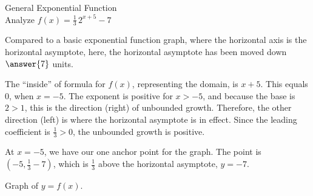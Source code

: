 \documentclass{ximera}
\begin{document}
\begin{example}  General Exponential Function \\



Analyze   $f(x) = \frac{1}{3} \, 2^{x+5} - 7$ \\


\begin{explanation}

Compared to a basic exponential function graph, where the horizontal axis is the horizontal asymptote, here, the horizontal asymptote has been moved down $\answer{7}$ units.



The ``inside'' of formula for $f(x)$, representing the domain, is $x+5$.  This equals $0$, when $x=-5$.  The exponent is positive for $x>-5$, and because the base is $2 > 1$, this is the direction (right) of unbounded growth.  Therefore, the other direction (left) is where the horizontal asymptote is in effect.  Since the leading coefficient is $\frac{1}{3} > 0$, the unbounded growth is positive.

At $x=-5$, we have our one anchor point for the graph.  The point is $\left(-5, \frac{1}{3} - 7 \right)$, which is $\frac{1}{3}$ above the horizontal asymptote, $y = -7$.


Graph of $y = f(x)$.

\begin{image}
\end{image}
\end{explanation}
\end{example}
\end{document}
